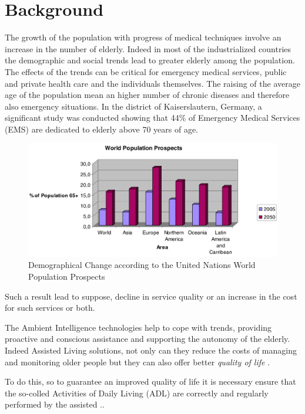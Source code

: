 \documentclass{thesisreport}
\begin{document}
 \section*{Background}
 The growth of the population with progress of medical techniques involve an increase in the number of elderly. Indeed in most of the industrialized countries the demographic and social trends lead to greater elderly among the population. The effects of the trends can be critical for emergency medical services, public and private health care and the individuals themselves. 
 The raising of the average age of the population mean an higher number of chronic diseases and therefore also emergency situations. 
 In the district of Kaiserslautern, Germany, a significant study was conducted showing that 44\% of Emergency Medical Services (EMS) are dedicated to elderly above 70 years of age.
 	\begin{figure}[H]
		\centering
		\includegraphics[width=12cm]{Thesis/data/populationProspect.png}
		\caption{\small{Demographical Change according to the United Nations World Population Prospects \cite{kleinberger2007ambient}}}
		\label{fig:populationProspect}
	\end{figure}
 Such a result lead to suppose, decline in service quality or an increase in the cost for such services or both. 
 
 \parskip  \parskip
 
 The Ambient Intelligence technologies help to cope with trends, providing proactive and conscious assistance and supporting the autonomy of the elderly. Indeed Assisted Living solutions, not only can they reduce the costs of managing and monitoring older people but they can also offer better \textit{quality of life} \cite{kleinberger2007ambient}. 
 
 \parskip \parskip
 
 To do this, so to guarantee an improved quality of life it is necessary ensure that the so-colled Activities of Daily Living (ADL) are correctly and regularly performed by the assisted \cite{buoncompagni2017towards}.. 
 
\end{document}
